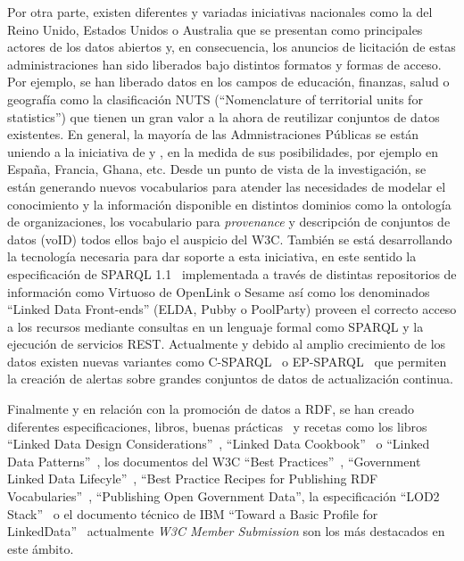 \documentclass[a4paper,final,11pt,fleqn,twoside]{book}  %
\begin{document}
Por otra parte, existen diferentes y variadas iniciativas nacionales como la del Reino Unido, Estados 
Unidos o Australia que se presentan como principales actores de los datos abiertos y, en consecuencia, 
los anuncios de licitación de estas administraciones han sido liberados bajo distintos formatos y formas 
de acceso. Por ejemplo, se han liberado datos en los campos de educación, finanzas, salud o geografía como 
la clasificación NUTS (``Nomenclature of territorial units for statistics'') que tienen un gran valor a la ahora 
de reutilizar conjuntos de datos existentes. En general, la mayoría de las Admnistraciones Públicas 
se están uniendo a la iniciativa de \opendata y \linkeddata, en la medida de sus posibilidades, por ejemplo 
en España, Francia, Ghana, etc. Desde un punto de vista de la investigación, se están generando nuevos vocabularios 
para atender las necesidades de modelar el conocimiento y la información disponible 
en distintos dominios como la ontología de organizaciones, los vocabulario para \textit{provenance} y 
descripción de conjuntos de datos (voID) todos ellos bajo el auspicio del W3C. También se está desarrollando la tecnología necesaria 
para dar soporte a esta iniciativa, en este sentido la especificación de SPARQL 1.1~\cite{Sparql11} implementada a través de distintas 
repositorios de información como Virtuoso de OpenLink o Sesame así como los denominados 
``Linked Data Front-ends'' (ELDA, Pubby o PoolParty) proveen el correcto acceso a los recursos mediante 
consultas en un lenguaje formal como SPARQL y la ejecución de servicios REST. Actualmente y 
debido al amplio crecimiento de los datos existen nuevas variantes como C-SPARQL~\cite{Barbieri:2010:QRS:1860702.1860705} o 
EP-SPARQL~\cite{Anicic:2011:EUL:1963405.1963495} que permiten la creación de alertas sobre grandes conjuntos de datos de actualización continua.

Finalmente y en relación con la promoción de datos a RDF, se han creado diferentes especificaciones, 
libros, buenas prácticas~\cite{Berners-Lee-2006, okfn} y recetas como los libros ``Linked Data Design Considerations''~\cite{Heath_Bizer_2011}, 
``Linked Data Cookbook''~\cite{linked-data-cookbook} o “Linked Data Patterns”~\cite{linked-data-patterns}, los documentos 
del W3C ``Best Practices''~\cite{publishing-ogd}, ``Government Linked Data Lifecyle''~\cite{gld-group}, 
``Best Practice Recipes for Publishing RDF Vocabularies''~\cite{Berr08}, ``Publishing Open  Government Data'', la especificación ``LOD2 Stack''~\cite{lod2-stack} 
o el documento técnico de IBM ``Toward a Basic Profile for LinkedData''~\cite{basic-profile-ibm}  actualmente 
\textit{W3C Member Submission} son los más destacados en este ámbito.
\end{document}
